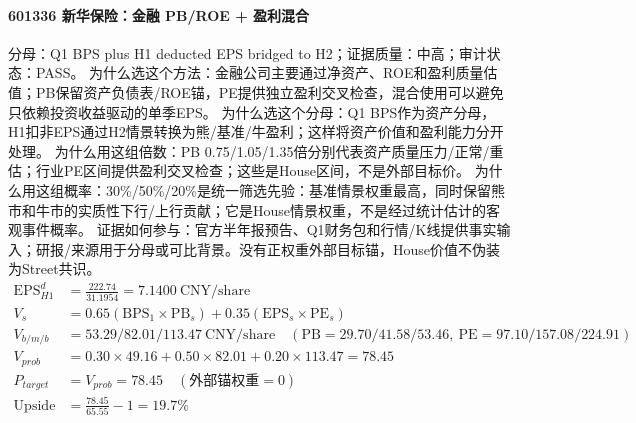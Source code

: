 \paragraph{601336 新华保险：金融 PB/ROE + 盈利混合}
分母：Q1 BPS plus H1 deducted EPS bridged to H2；证据质量：中高；审计状态：PASS。
为什么选这个方法：金融公司主要通过净资产、ROE和盈利质量估值；PB保留资产负债表/ROE锚，PE提供独立盈利交叉检查，混合使用可以避免只依赖投资收益驱动的单季EPS。
为什么选这个分母：Q1 BPS作为资产分母，H1扣非EPS通过H2情景转换为熊/基准/牛盈利；这样将资产价值和盈利能力分开处理。
为什么用这组倍数：PB 0.75/1.05/1.35倍分别代表资产质量压力/正常/重估；行业PE区间提供盈利交叉检查；这些是House区间，不是外部目标价。
为什么用这组概率：30\%/50\%/20\%是统一筛选先验：基准情景权重最高，同时保留熊市和牛市的实质性下行/上行贡献；它是House情景权重，不是经过统计估计的客观事件概率。
证据如何参与：官方半年报预告、Q1财务包和行情/K线提供事实输入；研报/来源用于分母或可比背景。没有正权重外部目标锚，House价值不伪装为Street共识。
\begin{align*}
\mathrm{EPS}_{H1}^d &= \frac{222.74}{31.1954} = 7.1400\ \mathrm{CNY/share}\\
V_s &= 0.65\left(\mathrm{BPS}_1\times \mathrm{PB}_s\right)+0.35\left(\mathrm{EPS}_s\times \mathrm{PE}_s\right)\\
V_{b/m/b} &= 53.29/82.01/113.47\ \mathrm{CNY/share}\quad(\mathrm{PB}=29.70/41.58/53.46,\ \mathrm{PE}=97.10/157.08/224.91)\\
V_{prob} &= 0.30\times 49.16+0.50\times 82.01+0.20\times 113.47=78.45\\
P_{target} &= V_{prob}=78.45\quad(\text{外部锚权重}=0)\\
\mathrm{Upside} &= \frac{78.45}{65.55}-1=19.7\%\\
\end{align*}

